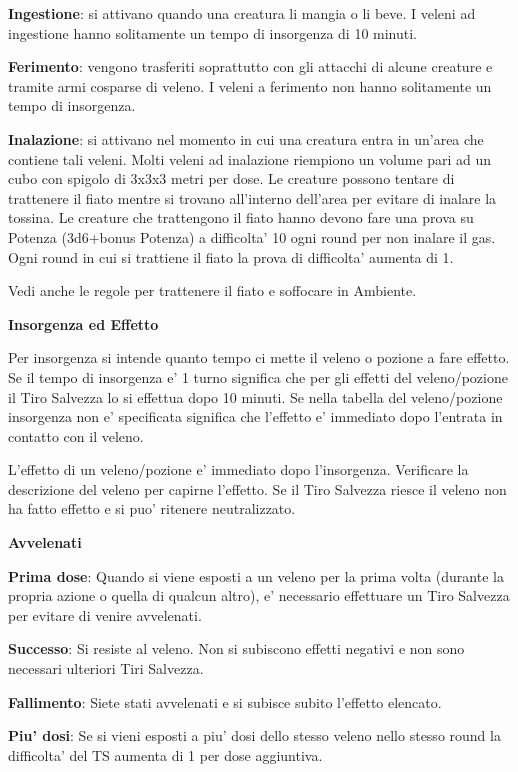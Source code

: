 \documentclass[a4paper,11pt,twoside,openany]{book}
\begin{document}
{\textbf{Ingestione}: si attivano quando una creatura li mangia o li beve. I veleni ad ingestione hanno solitamente un tempo di insorgenza di 10 minuti.

\textbf{Ferimento}: vengono trasferiti soprattutto con gli attacchi di alcune creature e tramite armi cosparse di veleno. I veleni a ferimento non hanno solitamente un tempo di insorgenza. 

\textbf{Inalazione}: si attivano nel momento in cui una creatura entra in un'area che contiene tali veleni. Molti veleni ad inalazione riempiono un volume pari ad un cubo con spigolo di 3x3x3 metri per dose. Le creature possono tentare di trattenere il fiato mentre si trovano all'interno dell'area per evitare di inalare la tossina. Le creature che trattengono il fiato hanno devono fare una prova su Potenza (3d6+bonus Potenza) a difficolta' 10 ogni round per non inalare il gas. Ogni round in cui si trattiene il fiato la prova di difficolta' aumenta di 1.

Vedi anche le regole per trattenere il fiato e soffocare in Ambiente.

\textbf{Insorgenza ed Effetto}

Per insorgenza si intende quanto tempo ci mette il veleno o pozione a fare effetto. Se il tempo di insorgenza e' 1 turno significa che per gli effetti del veleno/pozione il Tiro Salvezza lo si effettua dopo 10 minuti. Se nella tabella del veleno/pozione insorgenza non e' specificata significa che l'effetto e' immediato dopo l'entrata in contatto con il veleno.

L'effetto di un veleno/pozione e' immediato dopo l'insorgenza. Verificare la descrizione del veleno per capirne l'effetto. Se il Tiro Salvezza riesce il veleno non ha fatto effetto e si puo' ritenere neutralizzato. 

\bigskip

\textbf{Avvelenati}

\textbf{Prima dose}: Quando si viene esposti a un veleno per la prima volta (durante la propria azione o quella di qualcun altro), e' necessario effettuare un Tiro Salvezza per evitare di venire avvelenati. 

\textbf{Successo}: Si resiste al veleno. Non si subiscono effetti negativi e non sono necessari ulteriori Tiri Salvezza.

\textbf{Fallimento}: Siete stati avvelenati e si subisce subito l'effetto elencato.

\textbf{Piu' dosi}: Se si vieni esposti a piu' dosi dello stesso veleno nello stesso round la difficolta' del TS aumenta di 1 per dose aggiuntiva.

}
\end{document}
